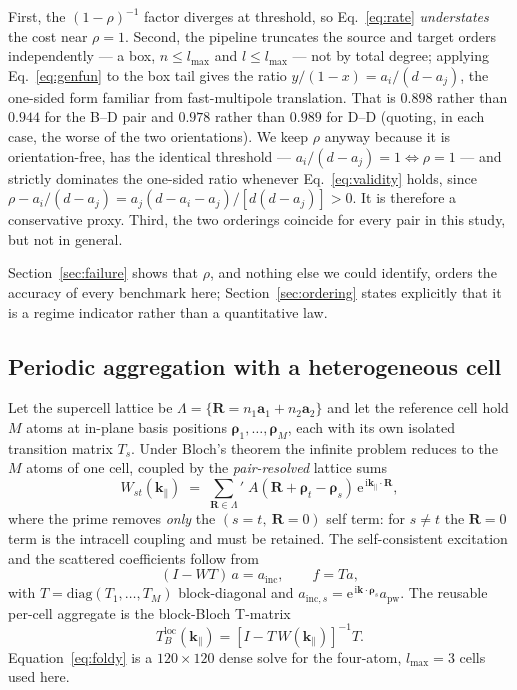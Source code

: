 \documentclass[11pt,a4paper]{article}
\newcommand{\lmax}{\ensuremath{l_{\max}}}
\newcommand{\kpar}{\ensuremath{\mathbf{k}_\parallel}}
\newcommand{\Rvec}{\ensuremath{\mathbf{R}}}
\newcommand{\rhovec}{\ensuremath{\boldsymbol{\rho}}}
\theoremstyle{plain}
\theoremstyle{definition}
\begin{document}
First, the $(1-\rho)^{-1}$ factor diverges at threshold, so Eq.~\eqref{eq:rate}
\emph{understates} the cost near $\rho = 1$. Second, the pipeline truncates the
source and target orders independently --- a box, $n \le \lmax$ and
$l \le \lmax$ --- not by total degree; applying Eq.~\eqref{eq:genfun} to the box
tail gives the ratio $y/(1-x) = a_i/(d - a_j)$, the one-sided form familiar from
fast-multipole translation. That is $0.898$ rather than $0.944$ for the B--D pair
and $0.978$ rather than $0.989$ for D--D (quoting, in each case, the worse of the
two orientations). We keep $\rho$ anyway because it is orientation-free, has the
identical threshold --- $a_i/(d-a_j) = 1 \Leftrightarrow \rho = 1$ --- and
strictly dominates the one-sided ratio whenever Eq.~\eqref{eq:validity} holds,
since $\rho - a_i/(d-a_j) = a_j(d - a_i - a_j)/[d(d-a_j)] > 0$. It is therefore a
conservative proxy. Third, the two orderings coincide for every pair in this
study, but not in general.

Section~\ref{sec:failure} shows that $\rho$, and nothing else we could identify,
orders the accuracy of every benchmark here; Section~\ref{sec:ordering} states
explicitly that it is a regime indicator rather than a quantitative law.

\subsection{Periodic aggregation with a heterogeneous cell}

Let the supercell lattice be $\Lambda = \{\Rvec = n_1 \mathbf{a}_1 + n_2
\mathbf{a}_2\}$ and let the reference cell hold $M$ atoms at in-plane basis
positions $\rhovec_1,\dots,\rhovec_M$, each with its own isolated transition
matrix $T_s$. Under Bloch's theorem the infinite problem reduces to the $M$ atoms
of one cell, coupled by the \emph{pair-resolved} lattice sums
\begin{equation}
  W_{st}(\kpar)
    \;=\; {\sum_{\Rvec \in \Lambda}}'\;
      A\!\left(\Rvec + \rhovec_t - \rhovec_s\right)\,
      \mathrm{e}^{\,\mathrm{i}\kpar\cdot\Rvec},
  \label{eq:W}
\end{equation}
where the prime removes \emph{only} the $(s = t,\ \Rvec = 0)$ self term: for
$s \neq t$ the $\Rvec = 0$ term is the intracell coupling and must be retained.
The self-consistent excitation and the scattered coefficients follow from
\begin{equation}
  (I - W T)\,a = a_{\text{inc}},
  \qquad
  f = T a ,
  \label{eq:foldy}
\end{equation}
with $T = \mathrm{diag}(T_1,\dots,T_M)$ block-diagonal and $a_{\text{inc},s} =
\mathrm{e}^{\,\mathrm{i}\mathbf{k}\cdot\rhovec_s} a_{\text{pw}}$. The reusable
per-cell aggregate is the block-Bloch T-matrix
\begin{equation}
  T_B^{\text{loc}}(\kpar) = \left[I - T\,W(\kpar)\right]^{-1} T .
  \label{eq:TB}
\end{equation}
Equation~\eqref{eq:foldy} is a $120 \times 120$ dense solve for the four-atom,
$\lmax = 3$ cells used here.
\end{document}
